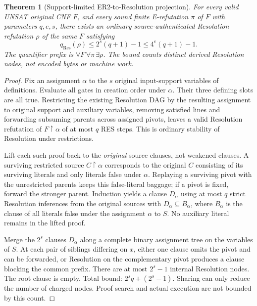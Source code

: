 \documentclass[11pt]{article}
\newtheorem{theorem}{Theorem}
\begin{document}
\begin{theorem}[Support-limited ER2-to-Resolution projection]
For every valid UNSAT original CNF $F$, and every sound finite E-refutation $\pi$ of $F$ with parameters $q,e,s$, there exists an ordinary source-authenticated Resolution refutation $\rho$ of the same $F$ satisfying
\[
\boxed{q_{\mathrm{Res}}(\rho)\le 2^s(q+1)-1\le 4^e(q+1)-1.}
\]
The quantifier prefix is $\forall F\,\forall\pi\,\exists\rho$. The bound counts distinct derived Resolution nodes, not encoded bytes or machine work.
\end{theorem}
\begin{proof}
Fix an assignment $\alpha$ to the $s$ original input-support variables of definitions. Evaluate all gates in creation order under $\alpha$. Their three defining slots are all true. Restricting the existing Resolution DAG by the resulting assignment to original support and auxiliary variables, removing satisfied lines and forwarding subsuming parents across assigned pivots, leaves a valid Resolution refutation of $F\restriction\alpha$ of at most $q$ RES steps. This is ordinary stability of Resolution under restrictions.

Lift each such proof back to the \emph{original} source clauses, not weakened clauses. A surviving restricted source $C\restriction\alpha$ corresponds to the original $C$ consisting of its surviving literals and only literals false under $\alpha$. Replaying a surviving pivot with the unrestricted parents keeps this false-literal baggage; if a pivot is fixed, forward the stronger parent. Induction yields a clause $D_\alpha$ using at most $q$ strict Resolution inferences from the original sources with $D_\alpha\subseteq B_\alpha$, where $B_\alpha$ is the clause of all literals false under the assignment $\alpha$ to $S$. No auxiliary literal remains in the lifted proof.

Merge the $2^s$ clauses $D_\alpha$ along a complete binary assignment tree on the variables of $S$. At each pair of siblings differing on $x$, either one clause omits the pivot and can be forwarded, or Resolution on the complementary pivot produces a clause blocking the common prefix. There are at most $2^s-1$ internal Resolution nodes. The root clause is empty. Total bound: $2^s q+(2^s-1)$. Sharing can only reduce the number of charged nodes. Proof search and actual execution are not bounded by this count.
\end{proof}
\end{document}
